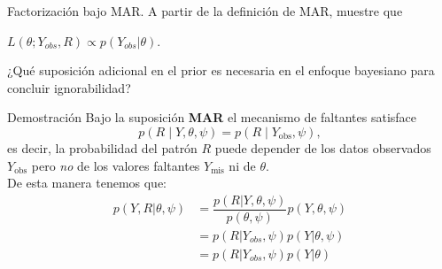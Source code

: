 \documentclass[a4paper,11pt]{article}
\begin{document}
\newpage
\begin{ejercicio}{6}
Factorización bajo MAR.
A partir de la definición de MAR, muestre que

$L(\theta; Y_{obs}, R) \propto p(Y_{obs} | \theta)$.

¿Qué suposición adicional en el prior es necesaria en el enfoque bayesiano para concluir
ignorabilidad?
\end{ejercicio}
\begin{demostracion}{Demostración}
Bajo la suposición \textbf{MAR } el mecanismo de faltantes satisface
\[
p(R\mid Y,\theta,\psi)=p(R\mid Y_{\text{obs}},\psi),
\]
es decir, la probabilidad del patrón \(R\) puede depender de los datos observados \(Y_{\text{obs}}\) pero \emph{no} de los valores faltantes \(Y_{\text{mis}}\) ni de \(\theta\).\\
De esta manera tenemos que:
\begin{align*}
    p(Y,R| \theta,\psi)&=\dfrac{p(R|Y,\theta,\psi)}{p(\theta,\psi)}p(Y,\theta,\psi)\\
    &=p(R|Y_{obs},\psi )p(Y|\theta,\psi)\\
    &=p(R|Y_{obs},\psi )p(Y|\theta)
\end{align*}


\end{demostracion}
\end{document}
